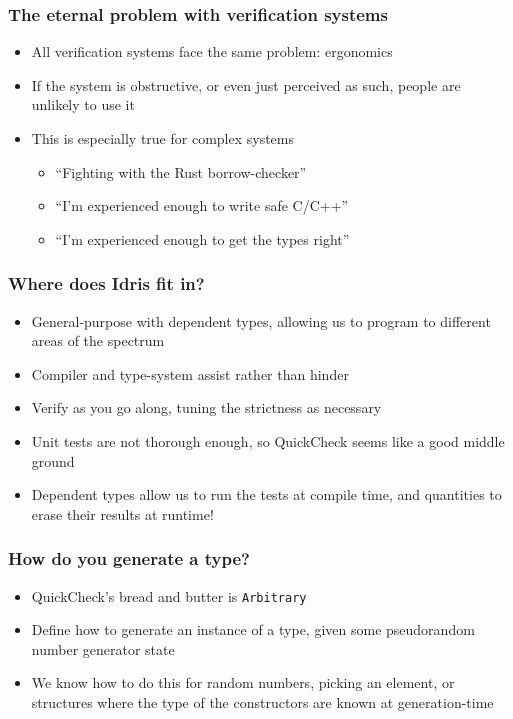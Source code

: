 \documentclass[compress,handout]{beamer}
\begin{document}
\begin{frame}
  \frametitle{The eternal problem with verification systems}

  \begin{itemize}
    \item<1-> All verification systems face the same problem: ergonomics
    \item<2-> If the system is obstructive, or even just perceived as such,
              people are unlikely to use it
    \item<3-> This is especially true for complex systems
    \begin{itemize}
      \item<4-> ``Fighting with the Rust borrow-checker''
      \item<5-> ``I'm experienced enough to write safe C/C++''
      \item<6-> ``I'm experienced enough to get the types right''
    \end{itemize}
  \end{itemize}

\end{frame}


\begin{frame}
  \frametitle{Where does Idris fit in?}

  \begin{itemize}
    \item<1-> General-purpose with dependent types, allowing us to program
              to different areas of the spectrum
    \item<2-> Compiler and type-system assist rather than hinder
    \item<3-> Verify as you go along, tuning the strictness as necessary
    \item<4-> Unit tests are not thorough enough, so QuickCheck seems like
              a good middle ground
    \item<5-> Dependent types allow us to run the tests at compile time,
              and quantities to erase their results at runtime!
  \end{itemize}

\end{frame}


\begin{frame}
  \frametitle{How do you generate a type?}

  \begin{itemize}
    \item<1-> QuickCheck's bread and butter is \texttt{Arbitrary}
    \item<2-> Define how to generate an instance of a type, given some
              pseudorandom number generator state
    \item<3-> We know how to do this for random numbers, picking an element, or
              structures where the type of the constructors are known at
              generation-time
  \end{itemize}

\end{frame}
\end{document}
